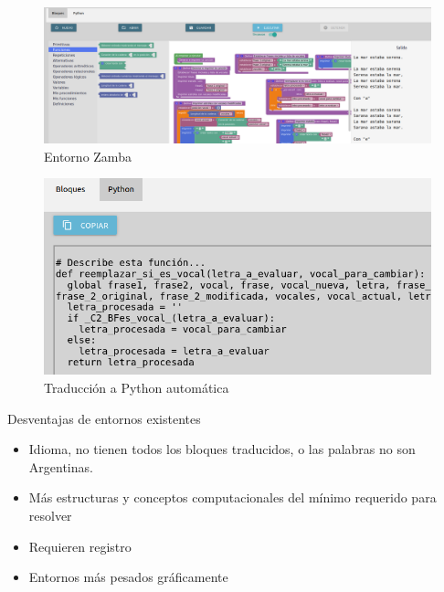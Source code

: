 \documentclass[final]{beamer}
\newlength{\twocolwid}
\begin{document}
\begin{frame}[t]
\begin{columns}[t]
\begin{column}{\twocolwid}
\begin{figure}
	\centering
	\includegraphics[width=1\linewidth]{zamba}
	\caption{Entorno Zamba}
	\label{fig:zamba}
\end{figure}

\begin{figure}
	\centering
	\includegraphics[width=0.7\linewidth]{pythonzamba.png}
	\caption{Traducción a Python automática}
	\label{fig:traduccion}
\end{figure}

\begin{block}{Desventajas de entornos existentes}
\begin{itemize}
    \item Idioma, no tienen todos los bloques traducidos, o las palabras no son Argentinas.
    \item Más estructuras y conceptos computacionales del mínimo requerido para resolver
    \item Requieren registro
    \item Entornos más pesados gráficamente
\end{itemize}
\end{block}






\end{column} %


\end{columns}
\end{frame}
\end{document}
